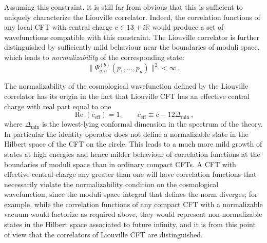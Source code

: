\documentclass[12pt,a4paper]{article}
\newcommand\RR{\mathbb{R}}
\DeclareMathOperator{\re}{Re}
\begin{document}
Assuming this constraint, it is still far from obvious that this is sufficient to uniquely characterize the Liouville correlator. Indeed, the correlation functions of any local CFT with central charge $c \in 13+i \RR$ would produce a set of wavefunctions compatible with this constraint. The Liouville correlator is further distinguished by sufficiently mild behaviour near the boundaries of moduli space, which leads to \emph{normalizability} of the corresponding state: 
\begin{equation}
    \lVert\Psi_{g,n}^{(b)}(p_1,\ldots,p_n)\rVert^2 < \infty\, .
\end{equation}

The normalizability of the cosmological wavefunction defined by the Liouville correlator has its origin in the fact that Liouville CFT has an effective central charge with real part equal to one 
\begin{equation}
    \re(c_{\text{eff}}) = 1,\qquad c_{\text{eff}} \equiv c -12\Delta_{\text{min}}\, ,
\end{equation}
where $\Delta_{\text{min}}$ is the lowest-lying conformal dimension in the spectrum of the theory. In particular the identity operator does not define a normalizable state in the Hilbert space of the CFT on the circle. This leads to a much more mild growth of states at high energies and hence milder behaviour of correlation functions at the boundaries of moduli space than in ordinary compact CFTs. A CFT with effective central charge any greater than one will have correlation functions that necessarily violate the normalizability condition on the cosmological wavefunction, since the moduli space integral that defines the norm diverges; for example, while the correlation functions of any compact CFT with a normalizable vacuum would factorize as required above, they would represent non-normalizable states in the Hilbert space associated to future infinity, and it is from this point of view that the correlators of Liouville CFT are distinguished.
\end{document}

